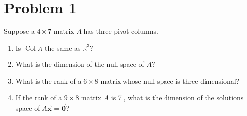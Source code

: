 \documentclass[letter,11pt]{article}
\theoremstyle{definition}
\begin{document}
\section{Problem 1}
Suppose a $4 \times 7$ matrix $A$ has three pivot columns.
\begin{enumerate}[label = \roman*.]
    \item Is $\operatorname{Col} A$ the same as $\mathbb{R}^{3}$?
    \item What is the dimension of the null space of $A$?
    \item What is the rank of a $6 \times 8$ matrix whose null space is three dimensional?
    \item If the rank of a $9 \times 8$ matrix $A$ is 7 , what is the dimension of the solutions space of $A \vec{\mathrm{\boldsymbol{x}}}=\vec{\boldsymbol{0}}$?
\end{enumerate}
\end{document}
